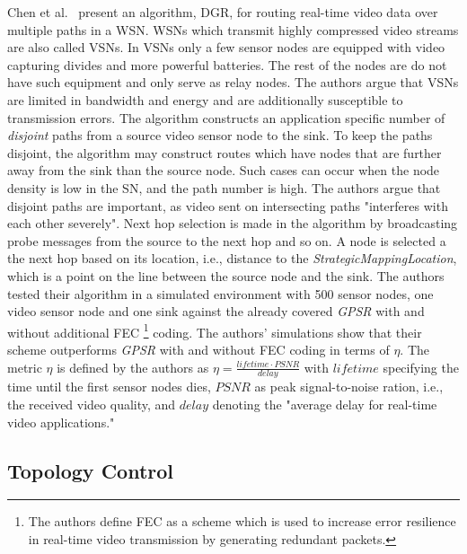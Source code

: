 Chen et al.~\cite{chen2011itinerary} present an algorithm, \ac{DGR}, for
routing real-time video data over multiple paths in a \ac{WSN}. \acp{WSN} which
transmit highly compressed video streams are also called \acp{VSN}. In
\acp{VSN} only a few sensor nodes are equipped with video capturing divides and
more powerful batteries. The rest of the nodes are do not have such equipment
and only serve as relay nodes. The authors argue that \acp{VSN} are limited in
bandwidth and energy and are additionally susceptible to transmission errors.
The algorithm constructs an application specific number of \textit{disjoint}
paths from a source video sensor node to the sink. To keep the paths disjoint,
the algorithm may construct routes which have nodes that are further away from
the sink than the source node. Such cases can occur when the node density is
low in the \ac{SN}, and the path number is high. The authors argue that
disjoint paths are important, as video sent on intersecting paths "interferes
with each other severely". Next hop selection is made in the algorithm by
broadcasting probe messages from the source to the next hop and so on. A node
is selected a the next hop based on its location, i.e., distance to the
\textit{StrategicMappingLocation}, which is a point on the line between the
source node and the sink. The authors tested their algorithm in a simulated
environment with 500 sensor nodes, one video sensor node and one sink against
the already covered \textit{GPSR} with and without additional \ac{FEC}
\footnote{The authors define \ac{FEC} as a scheme which is used to increase
error resilience in real-time video transmission by generating redundant
packets.} coding. The authors' simulations show that their scheme outperforms
\textit{GPSR} with and without \ac{FEC} coding in terms of $ \eta $. The metric
$ \eta $ is defined by the authors as $ \eta = \frac{lifetime \cdot
PSNR}{delay}$ with $ lifetime $ specifying the time until the first sensor
nodes dies, $ PSNR $ as peak signal-to-noise ration, i.e., the received video
quality, and $ delay $ denoting the "average delay for real-time video
applications."

\subsection{Topology Control}
\label{sec:Topology Control}


